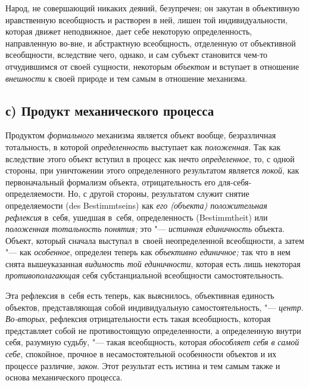 Народ, не совершающий никаких деяний, безупречен; он закутан
в объективную нравственную всеобщность и растворен в ней, лишен той
индивидуальности, которая движет неподвижное, дает себе некоторую
определенность, направленную во-вне, и абстрактную всеобщность, отделенную
от объективной всеобщности, вследствие чего, однако, и сам субъект
становится чем-то отчудившимся от своей сущности, некоторым
{\em объектом} и вступает
в отношение {\em внешности}
к своей природе и тем самым в отношение механизма.

\subsection[с) Продукт механического процесса]{с) Продукт механического процесса}

Продуктом
{\em формального}
механизма является объект вообще, безразличная тотальность, в
которой {\em определенность}
выступает как
{\em положенная}. Так как
вследствие этого объект вступил в процесс как нечто
{\em определенное}, то, с
одной стороны, при уничтожении этого определенного результатом является
{\em покой}, как
первоначальный формализм объекта, отрицательность его
для-себя-определяемости. Но, с другой стороны,
результатом служит
снятие
определяемости (des Bestimmt\-seins) как
{\em его (объекта) положительная
рефлексия} в~себя, ушедшая в~себя, определенность
(Bestimmt\-heit) или {\em положенная
тотальность понятия;} это
"--- {\em истинная единичность
}объекта. Объект, который сначала выступал в~своей
неопределенной всеобщности, а затем "--- как
{\em особенное},
определен теперь как
{\em объективно единичное;}
так что в нем снята вышеуказанная
{\em видимость той единичности},
которая есть лишь некоторая
{\em противополагающая}
себя субстанциальной всеобщности самостоятельность.

Эта рефлексия в~себя есть теперь, как выяснилось, объективная
единость объектов, представляющая собой индивидуальную самостоятельность,
"--- {\em центр}.
{\em Во-вторых},
рефлексия отрицательности есть такая всеобщность, которая
представляет собой не противостоящую определенности, а определенную внутри
себя, разумную судьбу, "--- такая всеобщность, которая
{\em обособляет себя в
}{\em самой себе},
спокойное, прочное в несамостоятельной особенности объектов и
их процессе различие, {\em закон}.
Этот результат есть истина и тем самым также и основа
механического процесса.

